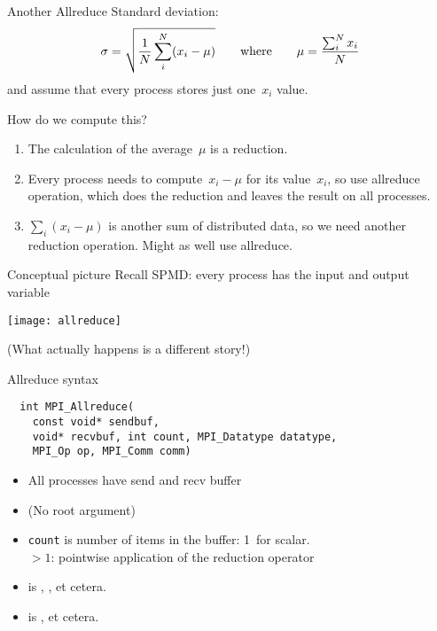 \begin{numberedframe}{Another Allreduce}
Standard deviation:
\[ \sigma = \sqrt{\frac1N \sum_i^N (x_i-\mu) }
\qquad\hbox{where}\qquad \mu = \frac{\sum_i^Nx_i}N
\]
and assume that every process stores just one~$x_i$ value.

How do we compute this?
\begin{enumerate}
\item The calculation of the average~$\mu$ is a reduction.
\item Every
  process needs to compute~$x_i-\mu$ for its value~$x_i$, so use
  allreduce operation, which does the reduction and leaves
  the result on all processes.
\item $\sum_i(x_i-\mu)$ is another sum of
  distributed data, so we need another reduction operation. Might as
  well use allreduce.
\end{enumerate}
\end{numberedframe}

\begin{numberedframe}{Conceptual picture}
  Recall SPMD: every process has the input and output variable

  \texttt{[image: allreduce]}

  (What actually happens is a different story!)
\end{numberedframe}

\begin{numberedframe}{Allreduce syntax}
\begin{lstlisting}
  int MPI_Allreduce(
    const void* sendbuf,
    void* recvbuf, int count, MPI_Datatype datatype,
    MPI_Op op, MPI_Comm comm)  
\end{lstlisting}
\begin{itemize}
\item All processes have send and recv buffer
\item (No root argument)
\item \lstinline{count} is number of items in the buffer: 1~for scalar.\\
  $>1$: pointwise application of the reduction operator
\item {} is , ,
   et cetera.
\item {} is ,  et cetera.
\end{itemize}
\end{numberedframe}

